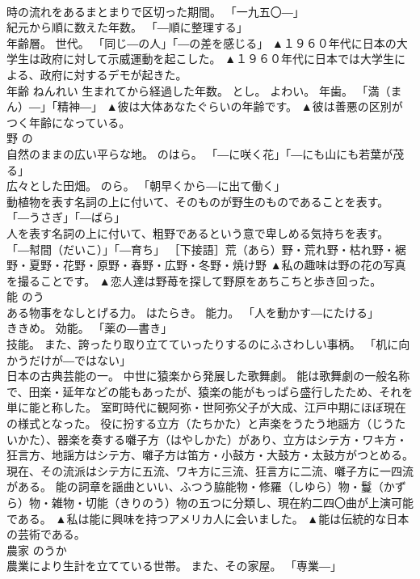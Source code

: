 \documentclass[8pt]{extreport}
\begin{document}
\begin{CJK}{UTF8}{min}
\\	時の流れをあるまとまりで区切った期間。 「一九五〇―」 
\\	紀元から順に数えた年数。 「―順に整理する」 
\\	年齢層。 世代。 「同じ―の人」「―の差を感じる」	▲１９６０年代に日本の大学生は政府に対して示威運動を起こした。 ▲１９６０年代に日本では大学生による、政府に対するデモが起きた。
\\	年齢	ねんれい	生まれてから経過した年数。 とし。 よわい。 年歯。 「満（まん）―」「精神―」	▲彼は大体あなたぐらいの年齢です。 ▲彼は善悪の区別がつく年齢になっている。
\\	野	の	
\\	自然のままの広い平らな地。 のはら。 「―に咲く花」「―にも山にも若葉が茂る」 
\\	広々とした田畑。 のら。 「朝早くから―に出て働く」 
\\	動植物を表す名詞の上に付いて、そのものが野生のものであることを表す。 「―うさぎ」「―ばら」 
\\	人を表す名詞の上に付いて、粗野であるという意で卑しめる気持ちを表す。 「―幇間（だいこ）」「―育ち」 ［下接語］荒（あら）野・荒れ野・枯れ野・裾野・夏野・花野・原野・春野・広野・冬野・焼け野	▲私の趣味は野の花の写真を撮ることです。 ▲恋人達は野苺を探して野原をあちこちと歩き回った。
\\	能	のう	
\\	ある物事をなしとげる力。 はたらき。 能力。 「人を動かす―にたける」 
\\	ききめ。 効能。 「薬の―書き」 
\\	技能。 また、誇ったり取り立てていったりするのにふさわしい事柄。 「机に向かうだけが―ではない」 
\\	日本の古典芸能の一。 中世に猿楽から発展した歌舞劇。 能は歌舞劇の一般名称で、田楽・延年などの能もあったが、猿楽の能がもっぱら盛行したため、それを単に能と称した。 室町時代に観阿弥・世阿弥父子が大成、江戸中期にほぼ現在の様式となった。 役に扮する立方（たちかた）と声楽をうたう地謡方（じうたいかた）、器楽を奏する囃子方（はやしかた）があり、立方はシテ方・ワキ方・狂言方、地謡方はシテ方、囃子方は笛方・小鼓方・大鼓方・太鼓方がつとめる。 現在、その流派はシテ方に五流、ワキ方に三流、狂言方に二流、囃子方に一四流がある。 能の詞章を謡曲といい、ふつう脇能物・修羅（しゆら）物・鬘（かずら）物・雑物・切能（きりのう）物の五つに分類し、現在約二四〇曲が上演可能である。	▲私は能に興味を持つアメリカ人に会いました。 ▲能は伝統的な日本の芸術である。
\\	農家	のうか	
\\	農業により生計を立てている世帯。 また、その家屋。 「専業―」 

\end{CJK}
\end{document}
